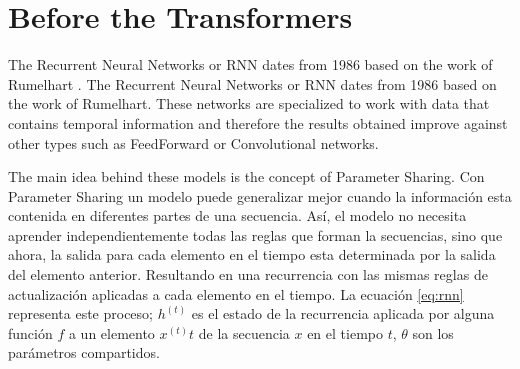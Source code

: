 
\section{Before the Transformers}


The Recurrent Neural Networks or RNN dates from 1986 based on the work of Rumelhart
\cite{Rumelhart}.
The Recurrent Neural Networks or RNN dates from 1986 based on the work of Rumelhart. These networks
are specialized to work with data that contains temporal information and therefore the results
obtained improve against other types such as FeedForward or Convolutional networks.


The main idea behind these models is the concept of Parameter Sharing. Con Parameter Sharing un
modelo puede generalizar mejor cuando la información esta contenida en diferentes partes de una
secuencia. Así, el modelo no necesita aprender independientemente todas las reglas que forman la
secuencias, sino que ahora, la salida para cada elemento en el tiempo esta determinada por la
salida del elemento anterior. Resultando en una recurrencia con las mismas reglas de actualización
aplicadas a cada elemento en el tiempo. La ecuación \ref{eq:rnn} representa este proceso; $h^{(t)}$
es el estado de la recurrencia aplicada por alguna función $f$ a un elemento $x^{(t)}t$ de la
secuencia $x$ en el tiempo $t$, $\theta$ son los parámetros compartidos.

